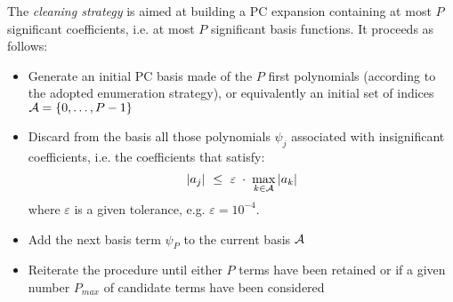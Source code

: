 {  The \emph{cleaning strategy} is aimed at building a PC expansion containing at most $P$ significant coefficients, i.e. at most $P$ significant basis functions. It proceeds as follows:
  \begin{itemize}
  \item Generate an initial PC basis made of the $P$ first polynomials (according to the adopted enumeration strategy), or equivalently an initial set of indices ${\mathcal A} = \{0,\dots,P-1\}$
  \item Discard from the basis all those polynomials $\psi_j$ associated with insignificant coefficients, i.e. the coefficients that satisfy:
    \begin{equation}
      |a_j| \, \, \leq \, \, \varepsilon \; \cdot \; \max_{k \in {\mathcal A}} |a_k|
    \end{equation}
    where $\varepsilon$ is a given tolerance, e.g. $\varepsilon = 10^{-4}$.
  \item Add the next basis term $\psi_{P}$ to the current basis ${\mathcal A}$
  \item Reiterate the procedure until either $P$ terms have been retained or if a given number $P_{max}$ of candidate terms have been considered
  \end{itemize}

}
